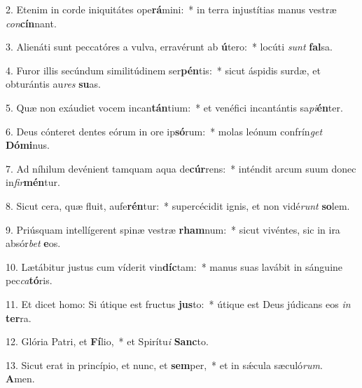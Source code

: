 2. Etenim in corde iniquitátes ope\textbf{rá}mini:~*  in terra injustítias manus vestræ \textit{con}\textbf{cín}nant.\

3. Alienáti sunt peccatóres a vulva, erravérunt ab \textbf{ú}tero:~*  locúti \textit{sunt} \textbf{fal}sa.\

4. Furor illis secúndum similitúdinem ser\textbf{pén}tis:~*  sicut áspidis surdæ, et obturántis au\textit{res} \textbf{su}as.\

5. Quæ non exáudiet vocem incan\textbf{tán}tium:~*  et venéfici incantántis sa\textit{pi}\textbf{én}ter.\

6. Deus cónteret dentes eórum in ore ip\textbf{só}rum:~*  molas leónum confrín\textit{get} \textbf{Dó}\textbf{mi}nus.\

7. Ad níhilum devénient tamquam aqua de\textbf{cúr}rens:~*  inténdit arcum suum donec in\textit{fir}\textbf{mén}tur.\

8. Sicut cera, quæ fluit, aufe\textbf{rén}tur:~*  supercécidit ignis, et non vidé\textit{runt} \textbf{so}lem.\

9. Priúsquam intellígerent spinæ vestræ \textbf{rham}num:~*  sicut vivéntes, sic in ira absór\textit{bet} \textbf{e}os.\

10. Lætábitur justus cum víderit vin\textbf{díc}tam:~*  manus suas lavábit in sánguine pec\textit{ca}\textbf{tó}ris.\

11. Et dicet homo: Si útique est fructus \textbf{jus}to:~*  útique est Deus júdicans eos \textit{in} \textbf{ter}ra.\

12. Glória Patri, et \textbf{Fí}lio,~*  et Spirítu\textit{i} \textbf{Sanc}to.\

13. Sicut erat in princípio, et nunc, et \textbf{sem}per,~*  et in sǽcula sæculó\textit{rum}. \textbf{A}men.\

